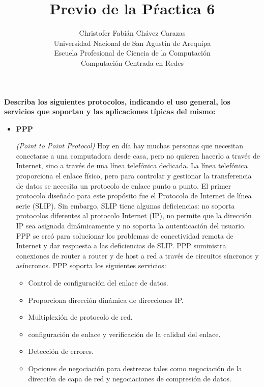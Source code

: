 \documentclass[a4paper,12pt]{article}
\begin{document}
\title{Previo de la Pŕactica 6}
\author{
Christofer Fabián Chávez Carazas \\
\small{Universidad Nacional de San Agustín de Arequipa} \\
\small{Escuela Profesional de Ciencia de la Computación} \\
\small{Computación Centrada en Redes}
}
\date{}

\maketitle

\textbf{Describa los siguientes protocolos, indicando el uso general, los servicios que soportan y las aplicaciones típicas del mismo:}
\begin{itemize}
 \item \textbf{PPP}
 
 \textit{(Point to Point Protocol)} Hoy en día  hay muchas personas que necesitan conectarse a una computadora desde casa, pero no quieren hacerlo a través de Internet, sino a través de una línea telefónica dedicada.
 La línea telefónica proporciona el enlace físico, pero para controlar y gestionar la transferencia de datos se necesita un protocolo de enlace punto a punto. 
 El primer protocolo diseñado para este propósito fue el Protocolo de Internet de línea serie (SLIP).
 Sin embargo, SLIP tiene algunas deficiencias: no soporta protocolos diferentes al protocolo Internet (IP), no permite que la dirección IP sea asignada dinámicamente y no soporta la autenticación del usuario.
 PPP se creó para solucionar los problemas de conectividad remota de Internet y dar respuesta a las deficiencias de SLIP.
 PPP suministra conexiones de router a router y de host a red a través de circuitos síncronos y asíncronos.
 PPP soporta los siguientes servicios:
 
 \begin{itemize}
  \item Control de configuración del enlace de datos.
  \item Proporciona dirección dinámica de direcciones IP.
  \item Multiplexión de protocolo de red.
  \item configuración de enlace y verificación de la calidad del enlace.
  \item Detección de errores.
  \item Opciones de negociación para destrezas tales como negociación de la dirección de capa de red y negociaciones de compresión de datos.
 \end{itemize}
 

\end{itemize}
\end{document}
